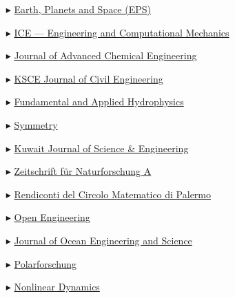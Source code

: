 \begin{itemize}
    \item[$\blacktriangleright$] \href{http://www.terrapub.co.jp/journals/EPS/}{Earth, Planets and Space (EPS)}
    
    \item[$\blacktriangleright$] \href{http://www.icevirtuallibrary.com/content/serial/eacm/}{ICE --- Engineering and Computational Mechanics}
    
    \item[$\blacktriangleright$] \href{http://www.ashdin.com/journals/jace/jace.aspx}{Journal of Advanced Chemical Engineering}
    
    \item[$\blacktriangleright$] \href{http://www.springer.com/engineering/civil+engineering/journal/12205}{KSCE Journal of Civil Engineering}
    
    \item[$\blacktriangleright$] \href{http://hydrophysics.info/?lang=en}{Fundamental and Applied Hydrophysics}
    
    \item[$\blacktriangleright$] \href{http://www.mdpi.com/journal/symmetry}{Symmetry}
    
    \item[$\blacktriangleright$] \href{http://pubcouncil.kuniv.edu.kw/kjs/}{Kuwait Journal of Science \& Engineering}
    
    \item[$\blacktriangleright$] \href{http://www.degruyter.com/view/j/zna}{Zeitschrift f\"ur Naturforschung A}
    
    \item[$\blacktriangleright$] \href{http://www.springer.com/mathematics/journal/12215}{Rendiconti del Circolo Matematico di Palermo }
    
    \item[$\blacktriangleright$] \href{https://www.degruyter.com/view/j/eng}{Open Engineering}

    \item[$\blacktriangleright$] \href{https://www.sciencedirect.com/journal/journal-of-ocean-engineering-and-science/}{Journal of Ocean Engineering and Science}
    
    \item[$\blacktriangleright$] \href{http://www.polarforschung.de/}{Polarforschung}
    
    \item[$\blacktriangleright$] \href{https://link.springer.com/journal/11071}{Nonlinear Dynamics}


\end{itemize}
